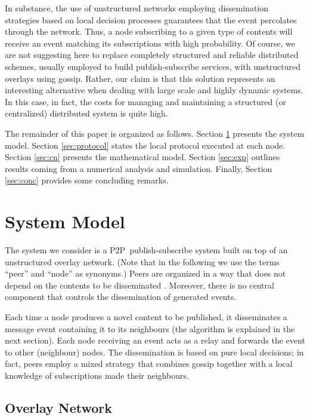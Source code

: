 \documentclass[10pt, conference, compsocconf]{IEEEtran}
\begin{document}
In substance, the use of unstructured networks employing dissemination strategies based on local decision processes guarantees that the event percolates through the network. Thus, a node subscribing to a given type of contents will receive an event matching its subscriptions with high probability.
Of course, we are not suggesting here to replace completely structured and reliable distributed schemes, usually employed to build publish-subscribe services, with unstructured overlays using gossip. Rather, our claim is that this solution represents an interesting alternative when dealing with large scale and highly dynamic systems. In this case, in fact, the costs for managing and maintaining a structured (or centralized) distributed system is quite high. 

The remainder of this paper is organized as follows. Section \ref{sec:model} presents the system model. Section \ref{sec:protocol} states the local protocol executed at each node. Section \ref{sec:cn} presents the mathematical model. Section \ref{sec:exp} outlines results coming from a numerical analysis and simulation. Finally, Section \ref{sec:conc} provides some concluding remarks.

\section{System Model}\label{sec:model}

The system we consider is a \ac{P2P}~publish-subscribe system built on top of an unstructured overlay network. 
(Note that in the following we use the terms ``peer'' and ``node'' as synonyms.)
Peers are organized in a way that does not depend on the contents to be disseminated \cite{gridpeer}. 
Moreover, there is no central component that controls the dissemination of generated events. 

Each time a node produces a novel content to be published, it disseminates a message event containing it to its neighbours (the algorithm is explained in the next section). Each node receiving an event acts as a relay and forwards the event to other (neighbour) nodes. The dissemination is based on pure local decisions; in fact, peers employ a mixed strategy that combines gossip together with a local knowledge of subscriptions made their neighbours.

\subsection{Overlay Network}
\end{document}

